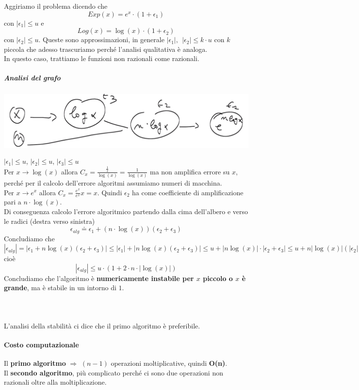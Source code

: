\documentclass[10pt]{book}
\begin{document}
Aggiriamo il problema dicendo che $$Exp(x) = e^x\cdot(1 + \epsilon_1)$$ con $|\epsilon_1| \leq u$ e $$Log(x) = \log(x)\cdot(1 + \epsilon_2)$$ con $|\epsilon_2| \leq u$. Queste sono approssimazioni, in generale $|\epsilon_1|,\:\:|\epsilon_2| \leq k\cdot u$ con $k$ piccola che adesso trascuriamo perché l'analisi qualitativa è analoga.\\
In questo caso, trattiamo le funzioni non razionali come razionali.
\subparagraph{Analisi del grafo}
\begin{center}
	\includegraphics[scale=0.4]{es2_grafo2.png}
\end{center}
$|\epsilon_1| \leq u$, $|\epsilon_2| \leq u$, $|\epsilon_3| \leq u$\\
Per $x \rightarrow \log(x)$ allora $C_x = \frac{\frac{1}{x}}{\log(x)} = \frac{1}{\log(x)}$ ma non amplifica errore su $x$, perché per il calcolo dell'errore algoritmi assumiamo numeri di macchina.\\
Per $x \rightarrow e^x$ allora $C_x = \frac{e^x}{e^x}x = x$. Quindi $\epsilon_2$ ha come coefficiente di amplificazione pari a $n\cdot\log(x)$.\\
Di conseguenza calcolo l'errore algoritmico partendo dalla cima dell'albero e verso le radici (destra verso sinistra) $$\epsilon_{alg} \doteq \epsilon_1 + (n\cdot\log(x))(\epsilon_2 + \epsilon_3)$$
Concludiamo che $|\epsilon_{alg}| = |\epsilon_1 + n\log(x)(\epsilon_2 + \epsilon_3)| \leq |\epsilon_1| + |n\log(x)(\epsilon_2 + \epsilon_3)| \leq u + |n\log(x)|\cdot |\epsilon_2 + \epsilon_3| \leq u + n|\log(x)|(|\epsilon_2| + |\epsilon_3|) \leq u + 2un|\log(x)| = u\cdot(1 + 2\cdot n\cdot|\log(x)|)$ cioè $$|\epsilon_{alg}| \leq u\cdot(1 + 2\cdot n\cdot|\log(x)|)$$ Concludiamo che l'algoritmo è \textbf{numericamente instabile per $x$ piccolo o $x$ è grande}, ma è stabile in un intorno di $1$.\\\\\\\\
L'analisi della stabilità ci dice che il primo algoritmo è preferibile.
\paragraph{Costo computazionale} Il \textbf{primo algoritmo} $\Rightarrow$ $(n - 1)$ operazioni moltiplicative, quindi \textbf{O(n)}.\\
Il \textbf{secondo algoritmo}, più complicato perché ci sono due operazioni non razionali oltre alla moltiplicazione.
\end{document}
